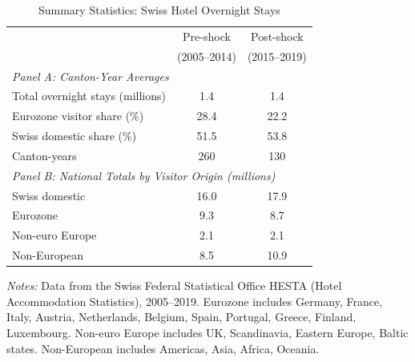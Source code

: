 \begin{table}[t]
\begin{threeparttable}
\centering
\caption{Summary Statistics: Swiss Hotel Overnight Stays}
\label{tab:summary}
\begin{tabular}{lcc}
\toprule
 & Pre-shock & Post-shock \\
 & (2005--2014) & (2015--2019) \\
\midrule
\multicolumn{3}{l}{\textit{Panel A: Canton-Year Averages}} \\[3pt]
Total overnight stays (millions) & 1.4 & 1.4 \\
Eurozone visitor share (\%) & 28.4 & 22.2 \\
Swiss domestic share (\%) & 51.5 & 53.8 \\
Canton-years & 260 & 130 \\[6pt]
\multicolumn{3}{l}{\textit{Panel B: National Totals by Visitor Origin (millions)}} \\[3pt]
Swiss domestic & 16.0 & 17.9 \\
Eurozone & 9.3 & 8.7 \\
Non-euro Europe & 2.1 & 2.1 \\
Non-European & 8.5 & 10.9 \\
\bottomrule
\end{tabular}
\begin{tablenotes}
\item \textit{Notes:} Data from the Swiss Federal Statistical Office HESTA (Hotel Accommodation Statistics), 2005--2019. Eurozone includes Germany, France, Italy, Austria, Netherlands, Belgium, Spain, Portugal, Greece, Finland, Luxembourg. Non-euro Europe includes UK, Scandinavia, Eastern Europe, Baltic states. Non-European includes Americas, Asia, Africa, Oceania.
\end{tablenotes}
\end{threeparttable}
\end{table}
